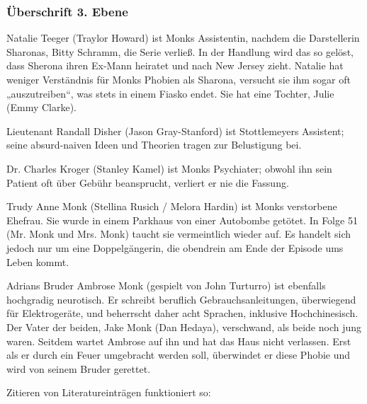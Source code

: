 \subsubsection{Überschrift  3. Ebene}
\label{subsec:ueberschrift_dritter_ebene_01}
\begin{compactitem}
  \item Natalie Teeger (Traylor Howard) ist Monks Assistentin, nachdem die Darstellerin Sharonas, Bitty Schramm, die Serie verließ. In der Handlung wird das so gelöst, dass Sherona ihren Ex-Mann heiratet und nach New Jersey zieht. Natalie hat weniger Verständnis für Monks Phobien als Sharona, versucht sie ihm sogar oft „auszutreiben“, was stets in einem Fiasko endet. Sie hat eine Tochter, Julie (Emmy Clarke). 
  \item Lieutenant Randall Disher (Jason Gray-Stanford) ist Stottlemeyers Assistent; seine absurd-naiven Ideen und Theorien tragen zur Belustigung bei. 
  \item Dr. Charles Kroger (Stanley Kamel) ist Monks Psychiater; obwohl ihn sein Patient oft über Gebühr beansprucht, verliert er nie die Fassung. 
  \item Trudy Anne Monk (Stellina Rusich / Melora Hardin) ist Monks verstorbene Ehefrau. Sie wurde in einem Parkhaus von einer Autobombe getötet. In Folge 51 (Mr. Monk und Mrs. Monk) taucht sie vermeintlich wieder auf. Es handelt sich jedoch nur um eine Doppelgängerin, die obendrein am Ende der Episode ums Leben kommt. 
  \item Adrians Bruder Ambrose Monk (gespielt von John Turturro) ist ebenfalls hochgradig neurotisch. Er schreibt beruflich Gebrauchsanleitungen, überwiegend für Elektrogeräte, und beherrscht daher acht Sprachen, inklusive Hochchinesisch. Der Vater der beiden, Jake Monk (Dan Hedaya), verschwand, als beide noch jung waren. Seitdem wartet Ambrose auf ihn und hat das Haus nicht verlassen. Erst als er durch ein Feuer umgebracht werden soll, überwindet er diese Phobie und wird von seinem Bruder gerettet.
\end{compactitem}

Zitieren von Literatureinträgen funktioniert so: \cite{sample1}